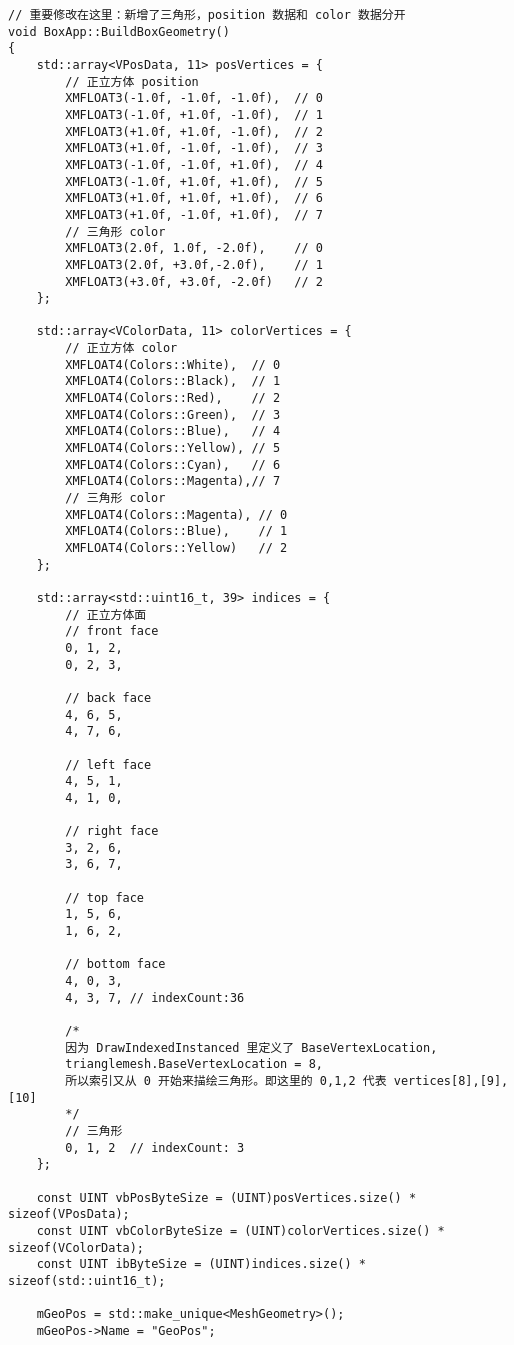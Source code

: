 \begin{lstlisting}
// 重要修改在这里：新增了三角形，position 数据和 color 数据分开
void BoxApp::BuildBoxGeometry()
{
    std::array<VPosData, 11> posVertices = {
        // 正立方体 position
        XMFLOAT3(-1.0f, -1.0f, -1.0f),  // 0
        XMFLOAT3(-1.0f, +1.0f, -1.0f),  // 1
        XMFLOAT3(+1.0f, +1.0f, -1.0f),  // 2
        XMFLOAT3(+1.0f, -1.0f, -1.0f),  // 3
        XMFLOAT3(-1.0f, -1.0f, +1.0f),  // 4
        XMFLOAT3(-1.0f, +1.0f, +1.0f),  // 5
        XMFLOAT3(+1.0f, +1.0f, +1.0f),  // 6
        XMFLOAT3(+1.0f, -1.0f, +1.0f),  // 7
        // 三角形 color
        XMFLOAT3(2.0f, 1.0f, -2.0f),    // 0
        XMFLOAT3(2.0f, +3.0f,-2.0f),    // 1
        XMFLOAT3(+3.0f, +3.0f, -2.0f)   // 2
    };

    std::array<VColorData, 11> colorVertices = {
        // 正立方体 color
        XMFLOAT4(Colors::White),  // 0
        XMFLOAT4(Colors::Black),  // 1
        XMFLOAT4(Colors::Red),    // 2
        XMFLOAT4(Colors::Green),  // 3
        XMFLOAT4(Colors::Blue),   // 4
        XMFLOAT4(Colors::Yellow), // 5
        XMFLOAT4(Colors::Cyan),   // 6
        XMFLOAT4(Colors::Magenta),// 7
        // 三角形 color
        XMFLOAT4(Colors::Magenta), // 0
        XMFLOAT4(Colors::Blue),    // 1
        XMFLOAT4(Colors::Yellow)   // 2
    };

    std::array<std::uint16_t, 39> indices = {
        // 正立方体面
        // front face
        0, 1, 2,
        0, 2, 3,

        // back face
        4, 6, 5,
        4, 7, 6,

        // left face
        4, 5, 1,
        4, 1, 0,

        // right face
        3, 2, 6,
        3, 6, 7,

        // top face
        1, 5, 6,
        1, 6, 2,

        // bottom face
        4, 0, 3,
        4, 3, 7, // indexCount:36

        /*
        因为 DrawIndexedInstanced 里定义了 BaseVertexLocation,
        trianglemesh.BaseVertexLocation = 8,
        所以索引又从 0 开始来描绘三角形。即这里的 0,1,2 代表 vertices[8],[9],[10]
        */
        // 三角形
        0, 1, 2  // indexCount: 3
    };

    const UINT vbPosByteSize = (UINT)posVertices.size() * sizeof(VPosData);
    const UINT vbColorByteSize = (UINT)colorVertices.size() * sizeof(VColorData);
    const UINT ibByteSize = (UINT)indices.size() * sizeof(std::uint16_t);

    mGeoPos = std::make_unique<MeshGeometry>();
    mGeoPos->Name = "GeoPos";


\end{lstlisting}
